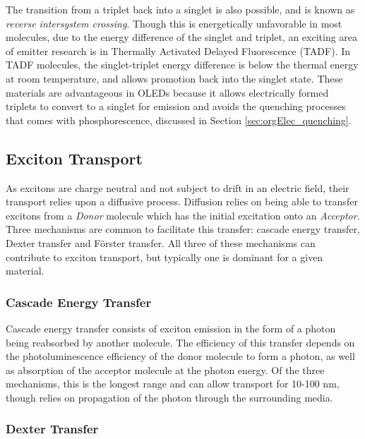 \documentclass[../thesis.tex]{subfiles}
\begin{document}
The transition from a triplet back into a singlet is also possible, and is known as \textit{reverse intersystem crossing}.\supercite{Chan2018,Lee2016,Inoue2016,Zhang2014a,Mehes2014,Zhang2012c,Endo2009,Li2013,Nakanotani2013,Nasu2013}
Though this is energetically unfavorable in most molecules, due to the energy difference of the singlet and triplet, an exciting area of emitter research is in Thermally Activated Delayed Fluorescence (TADF).
In TADF molecules, the singlet-triplet energy difference is below the thermal energy at room temperature, and allows promotion back into the singlet state.
These materials are advantageous in OLEDs because it allows electrically formed triplets to convert to a singlet for emission and avoids the quenching processes that comes with phosphorescence, discussed in Section \ref{sec:orgElec_quenching}.

\subsection{Exciton Transport}

As excitons are charge neutral and not subject to drift in an electric field, their transport relies upon a diffusive process.
Diffusion relies on being able to transfer excitons from a \textit{Donor} molecule which has the initial excitation onto an \textit{Acceptor}.
Three mechanisms are common to facilitate this transfer: cascade energy transfer, Dexter transfer and F\"{o}rster transfer.
All three of these mechanisms can contribute to exciton transport, but typically one is dominant for a given material.

\subsubsection{Cascade Energy Transfer}

Cascade energy transfer consists of exciton emission in the form of a photon being reabsorbed by another molecule.\supercite{Turro1991a}
The efficiency of this transfer depends on the photoluminescence efficiency of the donor molecule to form a photon, as well as absorption of the acceptor molecule at the photon energy.
Of the three mechanisms, this is the longest range and can allow transport for 10-100 nm, though relies on propagation of the photon through the surrounding media.

\subsubsection{Dexter Transfer}
\end{document}
